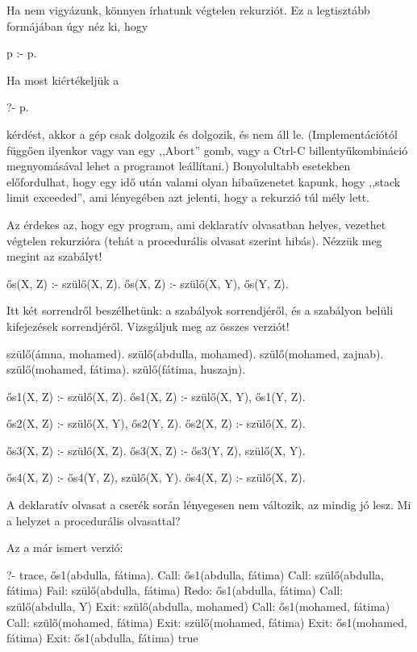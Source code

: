 Ha nem vigyázunk, könnyen írhatunk végtelen rekurziót. Ez a legtisztább formájában úgy néz ki, hogy
\begin{program}
p :- p.
\end{program}

Ha most kiértékeljük a
\begin{query}
?- p.
\end{query}
kérdést, akkor a gép csak dolgozik és dolgozik, és
nem áll le. (Implementációtól függően ilyenkor vagy
van egy ,,Abort'' gomb, vagy a Ctrl-C
billentyűkombináció megnyomásával lehet a programot
leállítani.) Bonyolultabb esetekben előfordulhat,
hogy egy idő után valami olyan hibaüzenetet kapunk,
hogy ,,stack limit exceeded'', ami lényegében azt
jelenti, hogy a rekurzió túl mély lett.

Az érdekes az, hogy egy program, ami deklaratív
olvasatban helyes, vezethet végtelen rekurzióra
(tehát a procedurális olvasat szerint hibás). Nézzük
meg megint az  szabályt!
\begin{program}
ős(X, Z) :- szülő(X, Z).
ős(X, Z) :- szülő(X, Y), ős(Y, Z).
\end{program}
Itt két sorrendről beszélhetünk: a szabályok
sorrendjéről, és a szabályon belüli kifejezések
sorrendjéről. Vizsgáljuk meg az összes verziót!
\begin{program}
szülő(ámna, mohamed).
szülő(abdulla, mohamed).
szülő(mohamed, zajnab).
szülő(mohamed, fátima).
szülő(fátima, huszajn).

ős1(X, Z) :- szülő(X, Z).
ős1(X, Z) :- szülő(X, Y), ős1(Y, Z).

ős2(X, Z) :- szülő(X, Y), ős2(Y, Z).
ős2(X, Z) :- szülő(X, Z).

ős3(X, Z) :- szülő(X, Z).
ős3(X, Z) :- ős3(Y, Z), szülő(X, Y).

ős4(X, Z) :- ős4(Y, Z), szülő(X, Y).
ős4(X, Z) :- szülő(X, Z).
\end{program}
A deklaratív olvasat a cserék során lényegesen nem
változik, az mindig jó lesz. Mi a helyzet a
procedurális olvasattal?

Az  a már ismert verzió:
\begin{query}
?- trace, ős1(abdulla, fátima).
Call: ős1(abdulla, fátima)
  Call: szülő(abdulla, fátima)
  Fail: szülő(abdulla, fátima)
Redo: ős1(abdulla, fátima)
  Call: szülő(abdulla, Y)
  Exit: szülő(abdulla, mohamed)
  Call: ős1(mohamed, fátima)
    Call: szülő(mohamed, fátima)
    Exit: szülő(mohamed, fátima)
  Exit: ős1(mohamed, fátima)
Exit: ős1(abdulla, fátima)
true
\end{query}

